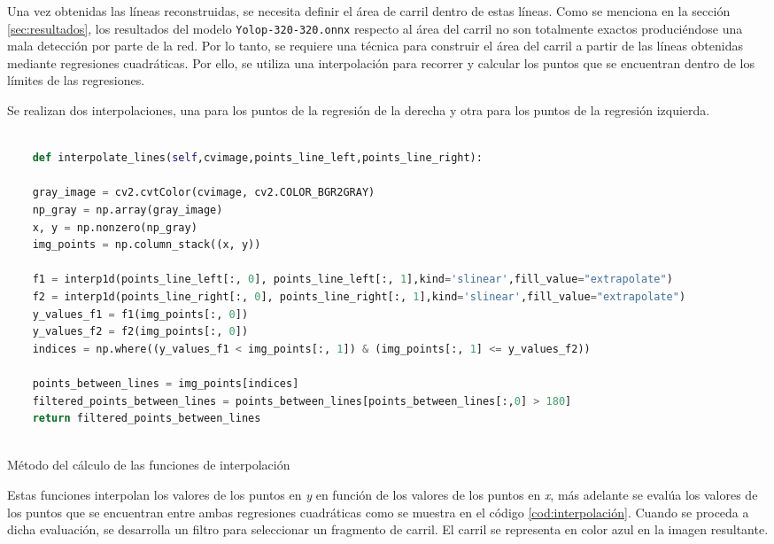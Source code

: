 Una vez obtenidas las líneas reconstruidas, se necesita definir el área de carril dentro de estas líneas. Como se menciona en la sección 
\ref{sec:resultados}, los resultados del modelo \texttt{Yolop-320-320.onnx} respecto al área del carril no son totalmente exactos produciéndose una mala detección por parte de la red. Por lo tanto, se requiere
una técnica para construir el área del carril a partir de las líneas obtenidas mediante regresiones cuadráticas. Por ello, se utiliza una interpolación para recorrer y calcular los puntos que se encuentran
dentro de los límites de las regresiones.

Se realizan dos interpolaciones, una para 
los puntos de la regresión de la  derecha
y otra para los puntos de la regresión izquierda. 


\begin{code}[h]
  \begin{lstlisting}[language=Python]

    def interpolate_lines(self,cvimage,points_line_left,points_line_right):

    gray_image = cv2.cvtColor(cvimage, cv2.COLOR_BGR2GRAY) 
    np_gray = np.array(gray_image)
    x, y = np.nonzero(np_gray)
    img_points = np.column_stack((x, y))

    f1 = interp1d(points_line_left[:, 0], points_line_left[:, 1],kind='slinear',fill_value="extrapolate")
    f2 = interp1d(points_line_right[:, 0], points_line_right[:, 1],kind='slinear',fill_value="extrapolate") 
    y_values_f1 = f1(img_points[:, 0])
    y_values_f2 = f2(img_points[:, 0])
    indices = np.where((y_values_f1 < img_points[:, 1]) & (img_points[:, 1] <= y_values_f2))
    
    points_between_lines = img_points[indices]
    filtered_points_between_lines = points_between_lines[points_between_lines[:,0] > 180]
    return filtered_points_between_lines
    
  \end{lstlisting}
  \caption[Método de interpolación]{Método del cálculo de las funciones de interpolación}
  \label{cod:interpolación}
  \end{code}  

Estas funciones interpolan los valores de los puntos en \textit{y} en función de los valores de los puntos en \textit{x}, 
más adelante se evalúa los valores de los puntos que se encuentran entre 
ambas regresiones cuadráticas como se muestra en el código \ref{cod:interpolación}. Cuando se proceda a dicha evaluación, se desarrolla un filtro 
para seleccionar un fragmento de carril. El carril se representa en color azul en la imagen resultante.

